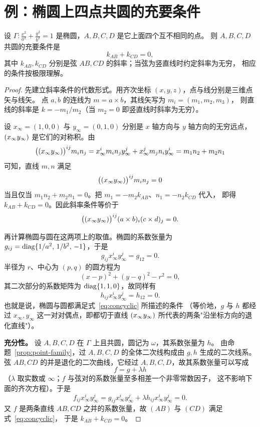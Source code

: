 \section{例：椭圆上四点共圆的充要条件}

\begin{example}[椭圆上四点共圆的斜率条件]\label{ex:concyclic}
设 $\Gamma:\frac{x^2}{a^2}+\frac{y^2}{b^2}=1$ 是椭圆，$A,B,C,D$ 是它上面四个互不相同的点。
则 $A,B,C,D$ 共圆的充要条件是
\[
k_{AB}+k_{CD}=0 ,
\]
其中 $k_{AB},k_{CD}$ 分别是弦 $AB,CD$ 的斜率；当弦为竖直线时约定斜率为无穷，
相应的条件按极限理解。
\end{example}

\begin{proof}
先建立斜率条件的代数形式。用齐次坐标 $(x,y,z)$，点与线分别是三维点矢与线矢。
点 $a,b$ 的连线为 $m=a\times b$，其线矢写为 $m_i=(m_1,m_2,m_3)$，
则直线的斜率是 $k=-m_1/m_2$（当 $m_2=0$ 即竖直线时斜率为无穷）。

设 $x_\infty=(1,0,0)$ 与 $y_\infty=(0,1,0)$ 分别是 $x$ 轴方向与 $y$ 轴方向的无穷远点，
$(x_\infty y_\infty)$ 是它们的对称积。由
\[
\bigl((x_\infty y_\infty)\bigr)^{ij}m_in_j
=x_\infty^im_in_jy_\infty^j+x_\infty^jm_jn_iy_\infty^i
=m_1n_2+m_2n_1
\]
可知，直线 $m,n$ 满足
\[
\bigl((x_\infty y_\infty)\bigr)^{ij}m_in_j=0
\]
当且仅当 $m_1n_2+m_2n_1=0$。把 $m_1=-m_2k_{AB}$、$n_1=-n_2k_{CD}$ 代入，
即得 $k_{AB}+k_{CD}=0$。因此斜率条件等价于
\begin{equation}\label{eq:concyclic}
\bigl((x_\infty y_\infty)\bigr)^{ij}(a\times b)_i(c\times d)_j=0 .
\end{equation}

再计算椭圆与圆在这两项上的取值。椭圆的系数张量为
$g_{ij}=\operatorname{diag}\{1/a^2,\,1/b^2,\,-1\}$，于是
\[
g_{ij}x_\infty^iy_\infty^j=g_{12}=0 .
\]
半径为 $r$、中心为 $(p,q)$ 的圆方程为
\[
(x-p)^2+(y-q)^2-r^2=0 ,
\]
其二次部分的系数矩阵为 $\operatorname{diag}\{1,1,0\}$，故同样有
\[
h_{ij}x_\infty^iy_\infty^j=h_{12}=0 .
\]
也就是说，椭圆与圆都满足式~\eqref{eq:concyclic} 所描述的条件
（等价地，$g$ 与 $h$ 都经过 $x_\infty,y_\infty$ 这一对对偶点，即都切于直线
$(x_\infty y_\infty)$ 所代表的两条"沿坐标方向的退化直线"）。

\textbf{充分性。} 设 $A,B,C,D$ 在 $\Gamma$ 上且共圆，圆记为 $\omega$，其系数张量为 $h$。
由命题~\ref{prop:point-family}，过 $A,B,C,D$ 的全体二次线构成由 $g,h$ 生成的二次线系。
弦 $AB,CD$ 的并是退化的二次曲线，它经过 $A,B,C,D$，故其系数张量可以写成
\[
f=g+\lambda h
\]
（$\lambda$ 取实数或 $\infty$；$f$ 与弦对的系数张量至多相差一个非零常数因子，
这不影响下面的齐次方程）。于是
\[
f_{ij}x_\infty^iy_\infty^j
=g_{ij}x_\infty^iy_\infty^j+\lambda h_{ij}x_\infty^iy_\infty^j=0 .
\]
又 $f$ 是两条直线 $AB,CD$ 之并的系数张量，故 $(AB)$ 与 $(CD)$ 满足式~\eqref{eq:concyclic}，
于是 $k_{AB}+k_{CD}=0$。


\end{proof}
